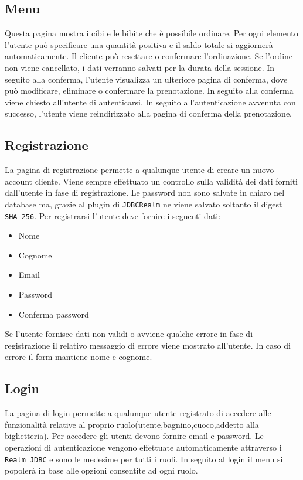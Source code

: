 \documentclass{article}
\begin{document}
\subsection{Menu}
Questa pagina mostra i cibi e le bibite che è possibile ordinare. Per ogni elemento l'utente può specificare una quantità positiva e il saldo totale si aggiornerà automaticamente. Il cliente può resettare o confermare l'ordinazione. Se l'ordine non viene cancellato, i dati verranno salvati per la durata della sessione. In seguito alla conferma, l'utente visualizza un ulteriore pagina di conferma, dove può modificare, eliminare o confermare la prenotazione. In seguito alla conferma viene chiesto all'utente di autenticarsi. In seguito all'autenticazione avvenuta con successo, l'utente viene reindirizzato alla pagina di conferma della prenotazione.
\subsection{Registrazione}
La pagina di registrazione permette a qualunque utente di creare un nuovo account cliente. Viene sempre effettuato un controllo sulla validità dei dati forniti dall'utente in fase di registrazione. Le password non sono salvate in chiaro nel database ma, grazie al plugin di \texttt{JDBCRealm} ne viene salvato soltanto il digest \texttt{SHA-256}.
Per registrarsi l'utente deve fornire i seguenti dati:
\begin{itemize}
	\item Nome
	\item Cognome
	\item Email
	\item Password
	\item Conferma password
\end{itemize}
Se l'utente fornisce dati non validi o avviene qualche errore in fase di registrazione il relativo messaggio di errore viene mostrato all'utente. In caso di errore il form mantiene nome e cognome.

\subsection{Login}
La pagina di login permette a qualunque utente registrato di accedere alle funzionalità relative al proprio ruolo(utente,bagnino,cuoco,addetto alla biglietteria). Per accedere gli utenti devono fornire email e password. Le operazioni di autenticazione vengono effettuate automaticamente attraverso i \texttt{Realm JDBC} e sono le medesime per tutti i ruoli. In seguito al login il menu si popolerà in base alle opzioni consentite ad ogni ruolo.
\end{document}
